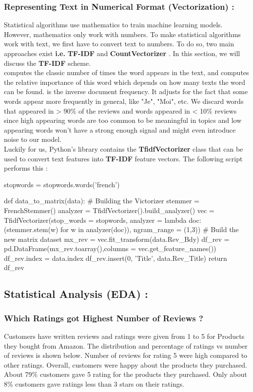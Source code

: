 \documentclass{article}
\begin{document}
\begin{enumerate}
\subsubsection{ Representing Text in Numerical Format (Vectorization) : }
Statistical algorithms use mathematics to train machine learning models. However, mathematics only work with numbers. To make statistical algorithms work with text, we first have to convert text to numbers. To do so, two main approaches exist \textbf{i.e.}  \textbf{TF-IDF} and \textbf{CountVectorizer} . In this section, we will discuss the \textbf{TF-IDF} scheme.\\
 computes the classic number of times the word appears in the text, and  computes the relative importance of this word which depends on how many texts the word can be found.  is the inverse document frequency. It adjusts for the fact that some words appear more frequently in general, like "Je", "Moi", etc. We discard words that appeared in > 90\% of the reviews and words appeared in < 10\% reviews since high appearing words are too common to be meaningful in topics and low appearing words won’t have a strong enough signal and might even introduce noise to our model.\\
Luckily for us, Python's  library contains the \textbf{TfidfVectorizer} class that can be used to convert text features into \textbf{TF-IDF} feature vectors. The following script performs this :
\begin{code}
stopwords = stopwords.words('french')

def data_to_matrix(data):
  # Building the Victorizer
  stemmer = FrenchStemmer()
  analyzer = TfidfVectorizer().build_analyzer()
  vec = TfidfVectorizer(stop_words = stopwords,
                        analyzer = lambda doc:(stemmer.stem(w) for w in analyzer(doc)),
                        ngram_range = (1,3))
  # Build the new matrix dataset
  mx_rev = vec.fit_transform(data.Rev_Bdy)
  df_rev = pd.DataFrame(mx_rev.toarray(),columns = vec.get_feature_names())
  df_rev.index = data.index
  df_rev.insert(0, 'Title', data.Rev_Title)
  return df_rev
\end{code}

\end{enumerate}


\subsection{ Statistical Analysis (EDA) :  }
\subsubsection{ Which Ratings got Highest Number of Reviews ? }
Customers have written reviews and ratings were given from 1 to 5 for Products they bought from Amazon. The distribution and percentage of ratings vs number of reviews is shown below. Number of reviews for rating 5 were high compared to other ratings. Overall, customers were happy about the products they purchased. About 79\% customers gave 5 rating for the products they purchased. Only about 8\% customers gave ratings less than 3 stars on their ratings.
\end{document}
